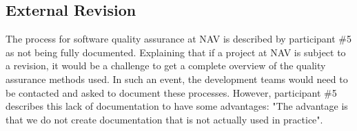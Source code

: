 




\subsection{External Revision} \label{sec:external_revision}
The process for software quality assurance at NAV is described by participant \#5 as not being fully documented. Explaining that if a project at NAV is subject to a revision, it would be a challenge to get a complete overview of the quality assurance methods used. In such an event, the development teams would need to be contacted and asked to document these processes. However, participant \#5 describes this lack of documentation to have some advantages: "The advantage is that we do not create documentation that is not actually used in practice".

